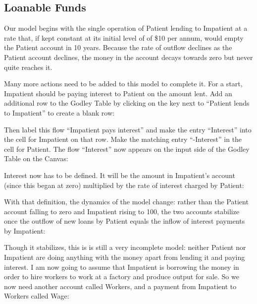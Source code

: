 \subsection{Loanable Funds}

Our model begins with the single operation of Patient lending to
Impatient at a rate that, if kept constant at its initial level of of
\$10 per annum, would empty the Patient account in 10 years. Because
the rate of outflow declines as the Patient account declines, the
money in the account decays towards zero but never quite reaches it.


Many more actions need to be added to this model to complete it. For a
start, Impatient should be paying interest to Patient on the amount
lent. Add an additional row to the Godley Table by clicking on the
 key
next to ``Patient lends to Impatient'' to create a blank row:


Then label this flow ``Impatient pays interest'' and make the entry
``Interest'' into the cell for Impatient on that row. Make the matching
entry ``-Interest'' in the cell for Patient. The flow ``Interest'' now
appears on the input side of the Godley Table on the Canvas: 


Interest now has to be defined. It will be the amount in Impatient's
account (since this began at zero) multiplied by the rate of interest
charged by Patient:


With that definition, the dynamics of the model change: rather than
the Patient account falling to zero and Impatient rising to 100, the
two accounts stabilize once the outflow of new loans by Patient equals
the inflow of interest payments by Impatient:


Though it stabilizes, this is is still a very incomplete model:
neither Patient nor Impatient are doing anything with the money apart
from lending it and paying interest. I am now going to assume that
Impatient is borrowing the money in order to hire workers to work at a
factory and produce output for sale. So we now need another account
called Workers, and a payment from Impatient to Workers called Wage:


